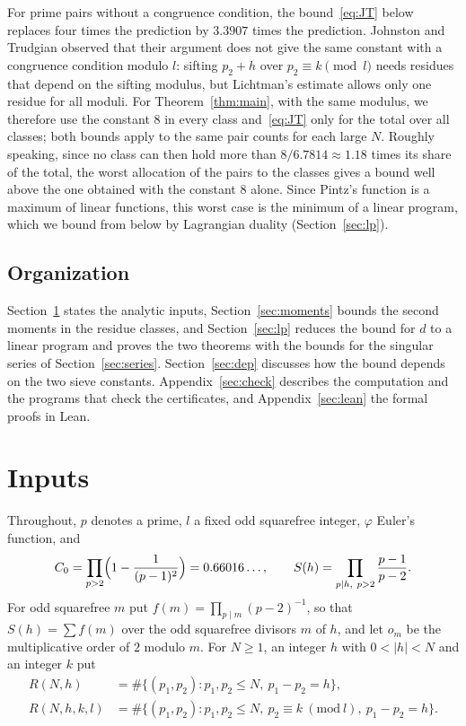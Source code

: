 \documentclass[11pt]{amsart}
\theoremstyle{definition}
\theoremstyle{remark}
\numberwithin{equation}{section}
\newcommand{\Lich}{6.7814}
\begin{document}
For prime pairs without a congruence condition, the bound~\eqref{eq:JT} below replaces four times the prediction by $3.3907$ times the prediction. Johnston and Trudgian observed that their argument does not give the same constant with a congruence condition modulo $l$: sifting $p_2+h$ over $p_2\equiv k\pmod l$ needs residues that depend on the sifting modulus, but Lichtman's estimate allows only one residue for all moduli. For Theorem~\ref{thm:main}, with the same modulus, we therefore use the constant $8$ in every class and~\eqref{eq:JT} only for the total over all classes; both bounds apply to the same pair counts for each large $N$. Roughly speaking, since no class can then hold more than $8/\Lich\approx1.18$ times its share of the total, the worst allocation of the pairs to the classes gives a bound well above the one obtained with the constant $8$ alone. Since Pintz's function is a maximum of linear functions, this worst case is the minimum of a linear program, which we bound from below by Lagrangian duality (Section~\ref{sec:lp}).

\subsection*{Organization}
Section~\ref{sec:inputs} states the analytic inputs, Section~\ref{sec:moments} bounds the second moments in the residue classes, and Section~\ref{sec:lp} reduces the bound for $d$ to a linear program and proves the two theorems with the bounds for the singular series of Section~\ref{sec:series}. Section~\ref{sec:dep} discusses how the bound depends on the two sieve constants. Appendix~\ref{sec:check} describes the computation and the programs that check the certificates, and Appendix~\ref{sec:lean} the formal proofs in Lean.

\section{Inputs}\label{sec:inputs}

Throughout, $p$ denotes a prime, $l$ a fixed odd squarefree integer, $\varphi$ Euler's function, and
\[
C_0=\prod_{p>2}\Bigl(1-\frac1{(p-1)^2}\Bigr)=0.66016\ldots,\qquad S(h)=\prod_{p\mid h,\ p>2}\frac{p-1}{p-2}.
\]
For odd squarefree $m$ put $f(m)=\prod_{p\mid m}(p-2)^{-1}$, so that $S(h)=\sum f(m)$ over the odd squarefree divisors $m$ of $h$, and let $o_m$ be the multiplicative order of $2$ modulo $m$. For $N\ge1$, an integer $h$ with $0<|h|<N$ and an integer $k$ put
\begin{align*}
R(N,h)&=\#\{(p_1,p_2):p_1,p_2\le N,\ p_1-p_2=h\},\\
R(N,h,k,l)&=\#\{(p_1,p_2):p_1,p_2\le N,\ p_2\equiv k\ (\mathrm{mod}\ l),\ p_1-p_2=h\}.
\end{align*}
\end{document}
